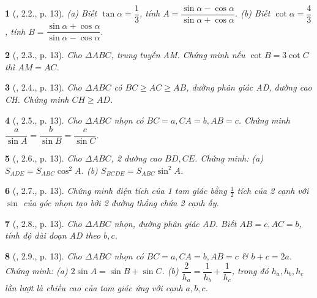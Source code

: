 \documentclass{article}
\newtheorem{baitoan}{}
\begin{document}
\begin{baitoan}[\cite{TLCT_THCS_Toan_9_hinh_hoc}, 2.2., p. 13]
	(a) Biết $\tan\alpha = \dfrac{1}{3}$, tính $A = \dfrac{\sin\alpha - \cos\alpha}{\sin\alpha + \cos\alpha}$. (b) Biết $\cot\alpha = \dfrac{4}{3}$, tính $B = \dfrac{\sin\alpha + \cos\alpha}{\sin\alpha - \cos\alpha}$.
\end{baitoan}

\begin{baitoan}[\cite{TLCT_THCS_Toan_9_hinh_hoc}, 2.3., p. 13]
	Cho $\Delta ABC$, trung tuyến AM. Chứng minh nếu $\cot B = 3\cot C$ thì $AM = AC$.
\end{baitoan}

\begin{baitoan}[\cite{TLCT_THCS_Toan_9_hinh_hoc}, 2.4., p. 13]
	Cho $\Delta ABC$ có $BC\ge AC\ge AB$, đường phân giác AD, đường cao CH. Chứng minh $CH\ge AD$.
\end{baitoan}

\begin{baitoan}[\cite{TLCT_THCS_Toan_9_hinh_hoc}, 2.5., p. 13]
	Cho $\Delta ABC$ nhọn có $BC = a,CA = b,AB = c$. Chứng minh $\dfrac{a}{\sin A} = \dfrac{b}{\sin B} = \dfrac{c}{\sin C}$.
\end{baitoan}

\begin{baitoan}[\cite{TLCT_THCS_Toan_9_hinh_hoc}, 2.6., p. 13]
	Cho $\Delta ABC$, 2 đường cao $BD,CE$. Chứng minh: (a) $S_{ADE} = S_{ABC}\cos^2A$. (b) $S_{BCDE} = S_{ABC}\sin^2A$.
\end{baitoan}

\begin{baitoan}[\cite{TLCT_THCS_Toan_9_hinh_hoc}, 2.7., p. 13]
	Chứng minh diện tích của 1 tam giác bằng $\frac{1}{2}$ tích của 2 cạnh với $\sin$ của góc nhọn tạo bởi 2 đường thẳng chứa 2 cạnh ấy.
\end{baitoan}

\begin{baitoan}[\cite{TLCT_THCS_Toan_9_hinh_hoc}, 2.8., p. 13]
	Cho $\Delta ABC$ nhọn, đường phân giác AD. Biết $AB = c,AC = b$, tính độ dài đoạn AD theo $b,c$.
\end{baitoan}

\begin{baitoan}[\cite{TLCT_THCS_Toan_9_hinh_hoc}, 2.9., p. 13]
	Cho $\Delta ABC$ nhọn có $BC = a,CA = b,AB = c$ \& $b + c = 2a$. Chứng minh: (a) $2\sin A = \sin B + \sin C$. (b) $\dfrac{2}{h_a} = \dfrac{1}{h_b} + \dfrac{1}{h_c}$, trong đó $h_a,h_b,h_c$ lần lượt là chiều cao của tam giác ứng với cạnh $a,b,c$.
\end{baitoan}
\end{document}
